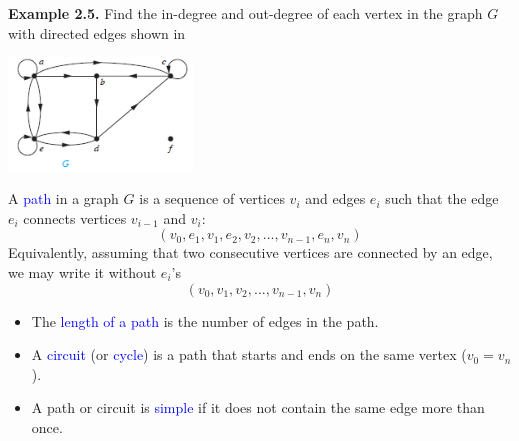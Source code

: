 \documentclass[aspectratio=169]{beamer}
\providecommand{\Blue}[1]{\textcolor{blue}{#1}}
\begin{document}
\begin{frame}[plain]{}
 
    {\bf Example 2.5.} Find the in-degree and out-degree of each vertex in the graph $G$ with
       directed edges shown in
       \medskip
       
       \begin{center}
         \includegraphics[height=3cm]{./img/lecture2-fig4.png}
       \end{center}
   \vspace{1in}
   
\end{frame}


\begin{frame}[plain]{}
 
   A \Blue{path} in a graph  $G$ is 
   a sequence of vertices $v_i$ and edges $e_i$ such that the edge $e_i$ connects vertices
   $v_{i-1}$ and $v_i$:
   \[ (v_0, e_1, v_1, e_2, v_2, ...,v_{n-1}, e_n, v_n) \]
   Equivalently,  assuming that two consecutive vertices are connected by an edge, we may write it without
   $e_i$'s
   \[ (v_0, v_1, v_2, ...,v_{n-1}, v_n) \]
   \pause
   \begin{itemize}
     \item The \Blue{length of a path} is the number of edges in the path.
      \item A \Blue{circuit} (or \Blue{cycle}) is  a path  
       that starts and ends on the same vertex ($v_0 = v_n$).
      \item A path or circuit is \Blue{simple} if it does not contain the same edge more than once.  \end{itemize}
  
\end{frame}
\end{document}
